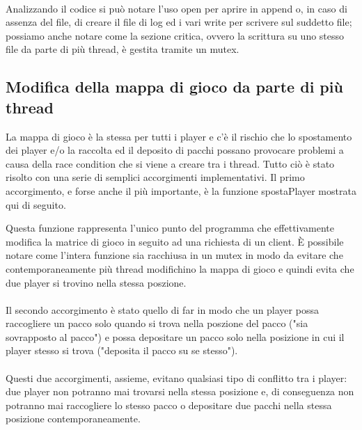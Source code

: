 \documentclass[a4paper]{article}
\begin{document}
\paragraph{}
Analizzando il codice si può notare l'uso open per aprire in append o, in caso di assenza del file, di creare
il file di log ed i vari write per scrivere sul suddetto file; possiamo anche notare come la sezione critica, ovvero 
la scrittura su uno stesso file da parte di più thread, è gestita tramite un mutex.

\subsection{Modifica della mappa di gioco da parte di più thread}
La mappa di gioco è la stessa per tutti i player e c'è il rischio che lo spostamento dei player e/o la raccolta ed il deposito di pacchi possano provocare problemi
a causa della race condition che si viene a creare tra i thread. Tutto ciò è stato risolto con una serie di semplici accorgimenti implementativi.
Il primo accorgimento, e forse anche il più importante, è la funzione spostaPlayer mostrata qui di seguito.

Questa funzione rappresenta l'unico punto del programma che effettivamente modifica la matrice di gioco in seguito ad una richiesta di un client.
È possibile notare come l'intera funzione sia racchiusa in un mutex in modo da evitare che contemporaneamente più thread modifichino la mappa di gioco e 
quindi evita che due player si trovino nella stessa poszione.
\paragraph{}Il secondo accorgimento è stato quello di far in modo che un player possa raccogliere un pacco solo quando si trova nella poszione del pacco
("sia sovrapposto al pacco") e possa depositare un pacco solo nella posizione in cui il player stesso si trova ("deposita il pacco su se stesso").
\paragraph{}
Questi due accorgimenti, assieme, evitano qualsiasi tipo di conflitto tra i player: due player non potranno mai trovarsi nella stessa posizione
e, di conseguenza non potranno mai raccogliere lo stesso pacco o depositare due pacchi nella stessa posizione contemporaneamente.
\end{document}
